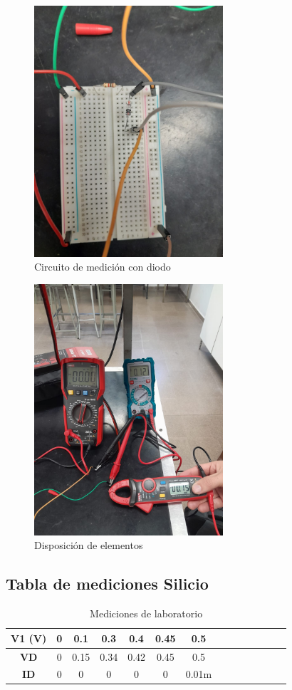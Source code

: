 \begin{figure}[H]
    \centering
    \includegraphics[width=7cm]{imagenes/proto1.jpg}
    \caption{Circuito de medición con diodo}
\end{figure}

\begin{figure}[H]
    \centering
    \includegraphics[width=7cm]{imagenes/elementos.jpg}
    \caption{Disposición de elementos}
\end{figure}


\subsection*{Tabla de mediciones Silicio}

\begin{table}[H]
\centering
\caption{Mediciones de laboratorio}
\begin{tabular}{|c|c|c|c|c|c|c|c|c|c|c|c|c|c|}
\hline
\textbf{V1 (V)} & 0 & 0.1 & 0.3 & 0.4 & 0.45 & 0.5\\
\hline
\textbf{VD} & 0 & 0.15 & 0.34 & 0.42 & 0.45 & 0.5 \\
\hline
\textbf{ID} & 0 & 0 & 0 & 0 & 0 & 0.01m \\
\hline
\end{tabular}
\end{table}

